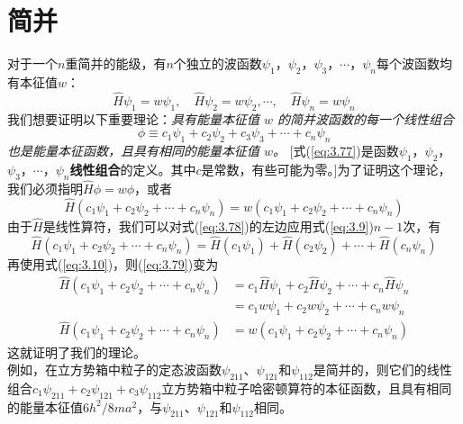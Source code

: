 \section{简并}
\label{sec:3.6 Degeneracy}
	对于一个$n$重简并的能级，有$n$个独立的波函数$\psi_1$，$\psi_2$，$\psi_3$，$\cdots$，$\psi_n$每个波函数均有本征值$w$：
	\begin{equation}
		\hat{H}\psi_1 = w\psi_1, \quad\hat{H}\psi_2 = w\psi_2, \cdots,\quad \hat{H}\psi_n = w\psi_n
		\label{eq:3.76}
	\end{equation}
	我们想要证明以下重要理论：\textit{具有能量本征值 $w$ 的简并波函数的每一个线性组合}
	\begin{equation}
		\phi \equiv c_1\psi_1 + c_2\psi_2 + c_3\psi_3 + \cdots + c_n\psi_n
		\label{eq:3.77}
	\end{equation}
	\textit{也是能量本征函数，且具有相同的能量本征值 $w$。} [式(\ref{eq:3.77})是函数$\psi_1$，$\psi_2$，$\psi_3$，$\cdots$，$\psi_n$\textbf{线性组合}的定义。其中$c$是常数，有些可能为零。]为了证明这个理论，我们必须指明$\hat{H}\phi = w\phi$，或者
	\begin{equation}
		\hat{H}\left(c_1\psi_1 + c_2\psi_2 +  \cdots + c_n\psi_n\right) = w\left(c_1\psi_1 + c_2\psi_2 + \cdots + c_n\psi_n\right)
		\label{eq:3.78}
	\end{equation}	
	由于$\hat{H}$是线性算符，我们可以对式(\ref{eq:3.78})的左边应用式(\ref{eq:3.9})$n-1$次，有
	\begin{equation*}
		\hat{H}\left(c_1\psi_1 + c_2\psi_2 +  \cdots + c_n\psi_n\right) = \hat{H}\left(c_1\psi_1\right) + \hat{H}\left(c_2\psi_2\right) + \cdots + \hat{H}\left(c_n\psi_n\right)
	\end{equation*}
	再使用式(\ref{eq:3.10})，则(\ref{eq:3.79})变为
	\begin{equation*}
		\begin{aligned}
			\hat{H}\left(c_1\psi_1 + c_2\psi_2 +  \cdots + c_n\psi_n\right) &= c_1\hat{H}\psi_1 + c_2\hat{H}\psi_2 +  \cdots + c_n\hat{H}\psi_n \\
			&= c_1w\psi_1 + c_2w\psi_2 +  \cdots + c_nw\psi_n \\
			\hat{H}\left(c_1\psi_1 + c_2\psi_2 +  \cdots + c_n\psi_n\right) &= w\left(c_1\psi_1 + c_2\psi_2 +  \cdots + c_n\psi_n\right)
		\end{aligned}
	\end{equation*}
	这就证明了我们的理论。\\
	\indent 例如，在立方势箱中粒子的定态波函数$\psi_{211}$、$\psi_{121}$和$\psi_{112}$是简并的，则它们的线性组合$c_1\psi_{211} + c_2\psi_{121} + c_3\psi_{112}$立方势箱中粒子哈密顿算符的本征函数，且具有相同的能量本征值$6h^2/8ma^2$，与$\psi_{211}$、$\psi_{121}$和$\psi_{112}$相同。\\
